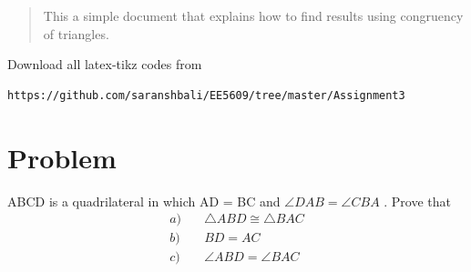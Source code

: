 \documentclass[journal,12pt,twocolumn]{IEEEtran}
\begin{document}
%
\begin{abstract}
This a simple document that explains how to find results using congruency of triangles.
\end{abstract}
%
%
Download all latex-tikz codes from 
%
\begin{lstlisting}
https://github.com/saranshbali/EE5609/tree/master/Assignment3
\end{lstlisting}
%
\section{Problem}
ABCD is a quadrilateral in which AD = BC and $\angle{DAB}  = \angle{CBA}$ . Prove that
\begin{align}
a) & \quad	\triangle ABD \cong \triangle BAC \\
b) & \quad BD = AC \\ 
c) & \quad \angle ABD = \angle BAC
\end{align}
\end{document}
